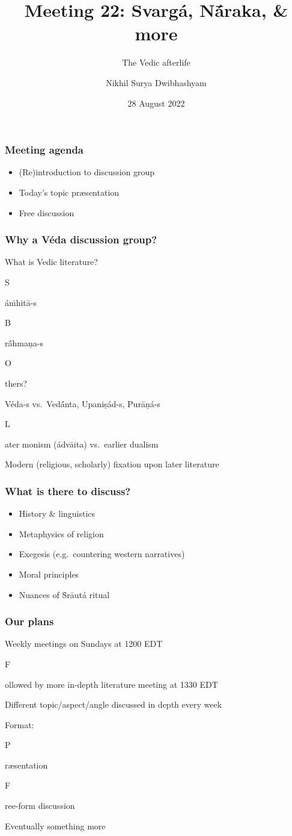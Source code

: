 \documentclass[pdf]{beamer}
\title{Meeting 22: Svargá, Nā́raka, \& more}
\subtitle{The Vedic afterlife}
\author{Nikhil Surya Dwibhashyam}
\date{28 August 2022}
\newcommand{\Subitem}[1]{{\setlength\itemindent{12pt} \item[-] #1}}
\begin{document}
\frame{\titlepage}

\begin{frame} \frametitle{Meeting agenda}
\begin{itemize}
	\item (Re)introduction to discussion group
	\item Today's topic præsentation
	\item Free discussion
\end{itemize}
\end{frame}

\begin{frame} \frametitle{Why a Véda discussion group?}
\begin{itemize}
	\item What is Vedic literature?
	\Subitem Sáṁhitā-s
	\Subitem Brā́hmaṇa-s
	\Subitem Others?
	\item Véda-s vs.~Vedā́nta,  Upaniṣád-s, Purāṇá-s
	\Subitem Later monism (ádvāita) vs.~earlier dualism
	\item Modern (religious, scholarly) fixation upon later literature
\end{itemize}
\end{frame}

\begin{frame} \frametitle{What is there to discuss?}
\begin{itemize}
	\item History \& linguistics
	\item Metaphysics of religion
	\item Exegesis (e.g.~countering western narratives)
	\item Moral principles
	\item Nuances of Ṡrāutá ritual
\end{itemize}
\end{frame}

\begin{frame} \frametitle{Our plans}
\begin{itemize}
	\item Weekly meetings on Sundays at 1200 EDT
	\Subitem Followed by more in-depth literature meeting at 1330 EDT
	\item Different topic/aspect/angle discussed in depth every week
	\item Format:
	\Subitem Præsentation
	\Subitem Free-form discussion
	\item Eventually something more
\end{itemize}
\end{frame}
\end{document}
